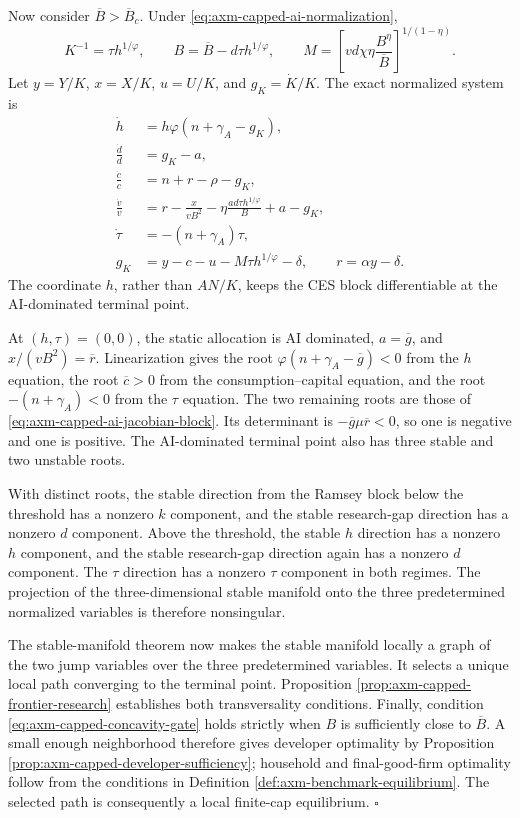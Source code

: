 Now consider \(\overline B>\overline B_c\). Under
\eqref{eq:axm-capped-ai-normalization},
\[
 K^{-1}=\tau h^{1/\varphi},
 \qquad
 B=\overline B-d\tau h^{1/\varphi},
 \qquad
 M=\left[vd\chi\eta\frac{B^\eta}{\overline B}
 \right]^{1/(1-\eta)}.
\]
Let \(y=Y/K\), \(x=X/K\), \(u=U/K\), and
\(g_K=\dot K/K\). The exact normalized system is
\begin{subequations}
\label{eq:axm-capped-ai-normalized-system}
\begin{align}
 \dot h&=h\varphi(n+\gamma_A-g_K),\\
 \frac{\dot d}{d}&=g_K-a,\\
 \frac{\dot c}{c}&=n+r-\rho-g_K,\\
 \frac{\dot v}{v}
 &=r-\frac{x}{vB^2}
 -\eta\frac{ad\tau h^{1/\varphi}}{B}+a-g_K,\\
 \dot\tau&=-(n+\gamma_A)\tau,\\
 g_K&=y-c-u-M\tau h^{1/\varphi}-\delta,
 \qquad r=\alpha y-\delta.
\end{align}
\end{subequations}
The coordinate \(h\), rather than \(AN/K\), keeps the CES block differentiable
at the AI-dominated terminal point.

At \((h,\tau)=(0,0)\), the static allocation is AI dominated,
\(a=\overline g\), and
\(x/(vB^2)=\overline r\). Linearization gives the root
\(\varphi(n+\gamma_A-\overline g)<0\) from the \(h\) equation, the root
\(\overline c>0\) from the consumption--capital equation, and the root
\(-(n+\gamma_A)<0\) from the \(\tau\) equation. The two remaining roots are those of
\eqref{eq:axm-capped-ai-jacobian-block}. Its determinant is
\(-\overline g\mu\overline r<0\), so one is negative and one is positive.
The AI-dominated terminal point also has three stable and two unstable roots.

With distinct roots, the stable direction from the Ramsey block below the
threshold has a nonzero \(k\) component, and the stable research-gap direction
has a nonzero \(d\) component. Above the threshold, the stable \(h\) direction
has a nonzero \(h\) component, and the stable research-gap direction again has
a nonzero \(d\) component. The \(\tau\) direction has a nonzero \(\tau\)
component in both regimes. The projection of the three-dimensional stable
manifold onto the three predetermined normalized variables is therefore
nonsingular.

The stable-manifold theorem now makes the stable manifold locally a graph of
the two jump variables over the three predetermined variables. It selects a
unique local path converging to the terminal point. Proposition
\ref{prop:axm-capped-frontier-research} establishes both transversality
conditions. Finally, condition \eqref{eq:axm-capped-concavity-gate} holds
strictly when \(B\) is sufficiently close to \(\overline B\). A small enough
neighborhood therefore gives developer optimality by Proposition
\ref{prop:axm-capped-developer-sufficiency}; household and final-good-firm
optimality follow from the conditions in Definition
\ref{def:axm-benchmark-equilibrium}. The selected path is consequently a local
finite-cap equilibrium. \(\square\)

